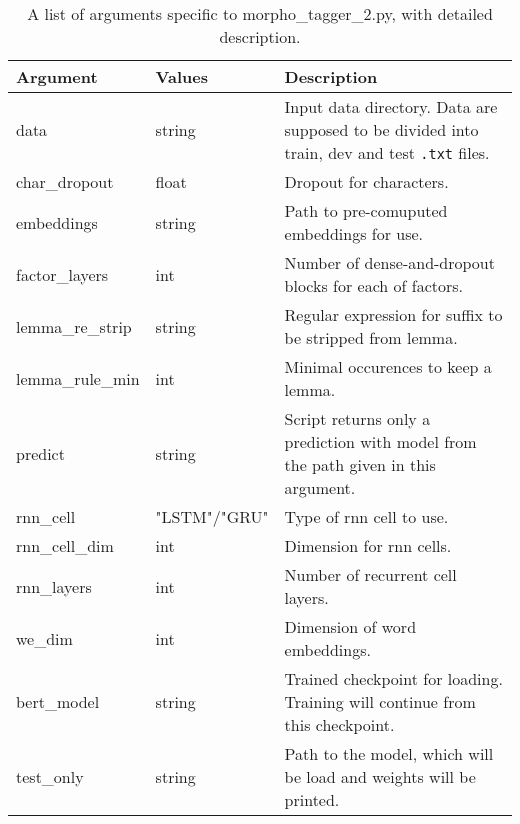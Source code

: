 \begin{table}
\centering
\begin{tabular}{ |p{3cm}|p{}|p{6cm}| } 
 \hline
 Argument & Values & Description \\ 
 \hline \hline
 data & string &  Input data directory. Data are supposed to be divided into train, dev and test \texttt{.txt} files. \\ \hline
 char\_dropout &  float &  Dropout for characters. \\ \hline
embeddings & string & Path to pre-comuputed embeddings for use. \\ \hline
factor\_layers & int & Number of dense-and-dropout blocks for each of factors.  \\ \hline
lemma\_re\_strip &  string & Regular expression for suffix to be stripped from lemma. \\ \hline
lemma\_rule\_min & int & Minimal occurences to keep a lemma.  \\ \hline
predict & string & Script returns only a prediction with model from the path given in this argument.  \\ \hline
rnn\_cell & "LSTM"/"GRU" & Type of rnn cell to use. \\ \hline
rnn\_cell\_dim & int & Dimension for rnn cells.  \\ \hline
rnn\_layers& int & Number of recurrent cell layers.  \\ \hline
we\_dim & int & Dimension of word embeddings.  \\ \hline  


bert\_model & string & Trained checkpoint for loading. Training will continue from this checkpoint. \\ \hline

test\_only & string & Path to the model, which will be load and weights will be printed.  \\ \hline
 \hline
\end{tabular}
\caption{A list of arguments specific to morpho\_tagger\_2.py, with detailed description.} 
\label{Tab:mt2_args}
\end{table}

